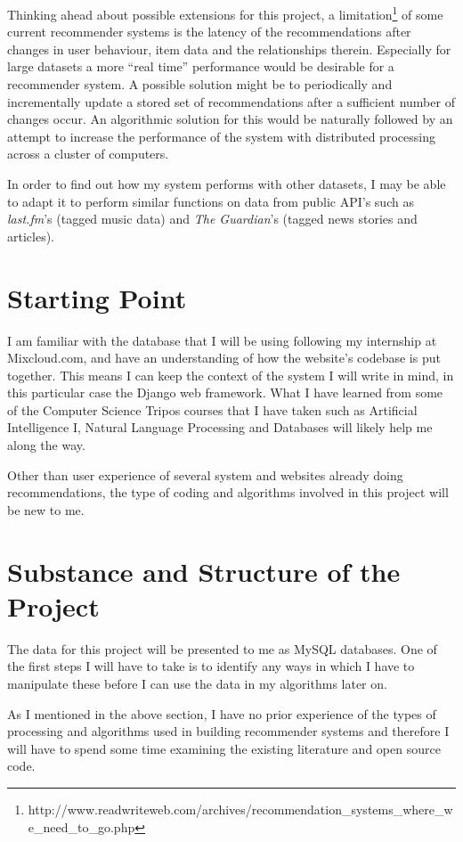 Thinking ahead about possible extensions for this project, a limitation\footnote{http://www.readwriteweb.com/archives/recommendation\_systems\_where\_we\_need\_to\_go.php} of some current recommender systems is the latency of the recommendations after changes in user behaviour, item data and the relationships therein. Especially for large datasets a more ``real time'' performance would be desirable for a recommender system. A possible solution might be to periodically and incrementally update a stored set of recommendations after a sufficient number of changes occur. An algorithmic solution for this would be naturally followed by an attempt to increase the performance of the system with distributed processing across a cluster of computers.

In order to find out how my system performs with other datasets, I may be able to adapt it to perform similar functions on data from public API's such as \textit{last.fm}'s (tagged music data) and \textit{The Guardian}'s (tagged news stories and articles).

\section{Starting Point}

I am familiar with the database that I will be using following my internship at Mixcloud.com, and have an understanding of how the website's codebase is put together. This means I can keep the context of the system I will write in mind, in this particular case the Django web framework. What I have learned from some of the Computer Science Tripos courses that I have taken such as Artificial Intelligence I, Natural Language Processing and Databases will likely help me along the way.

Other than user experience of several system and websites already doing recommendations, the type of coding and algorithms involved in this project will be new to me.
  
\section{Substance and Structure of the Project}

The data for this project will be presented to me as MySQL databases. One of the first steps I will have to take is to identify any ways in which I have to manipulate these before I can use the data in my algorithms later on.

As I mentioned in the above section, I have no prior experience of the types of processing and algorithms used in building recommender systems and therefore I will have to spend some time examining the existing literature and open source code.

